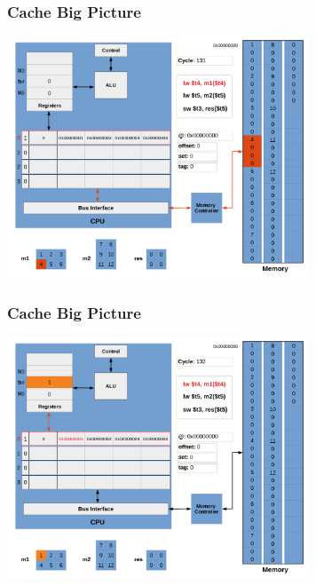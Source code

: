 \documentclass{beamer}
\begin{document}
\begin{frame}[fragile]
\frametitle{Cache Big Picture}

\begin{center}
\vspace*{-0.23cm}
\hspace*{-1cm}\includegraphics[width=9cm]{cache7.pdf}
\end{center}

\end{frame}

\begin{frame}[fragile]
\frametitle{Cache Big Picture}

\begin{center}
\vspace*{-0.23cm}
\hspace*{-1cm}\includegraphics[width=9cm]{cache8.pdf}
\end{center}

\end{frame}
\end{document}
